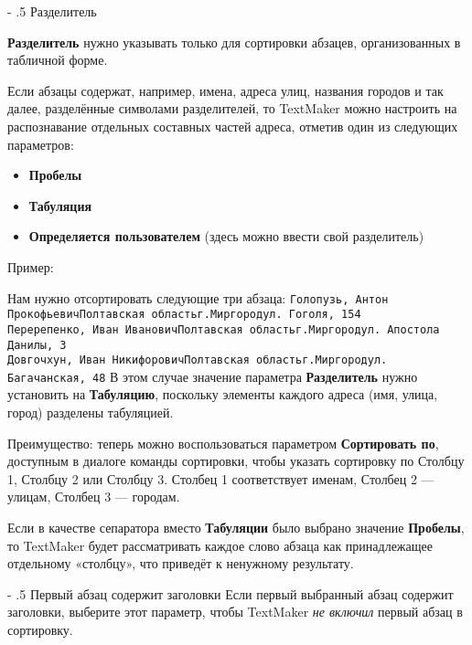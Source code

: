﻿\documentclass[a4paper,10pt]{article}
\makeatletter
\renewcommand\paragraph{%
   \@startsection{paragraph}{4}{0mm}%
      {-\baselineskip}%
      {.5\baselineskip}%
      {\normalfont\normalsize\bfseries}}
\makeatother
\begin{document}
\paragraph{Разделитель}

\textbf{Разделитель} нужно указывать только для сортировки абзацев, организованных в табличной форме.

Если абзацы содержат, например, имена, адреса улиц, названия городов и так далее, разделённые символами разделителей, то TextMaker можно настроить на распознавание отдельных составных частей адреса, отметив один из следующих параметров:
\begin{itemize}
 \item \textbf{Пробелы}
 \item \textbf{Табуляция}
 \item \textbf{Определяется пользователем} (здесь можно ввести свой разделитель)
\end{itemize}

Пример:

Нам нужно отсортировать следующие три абзаца:
\newline
\newline
\texttt{Голопузь, Антон ПрокофьевичПолтавская областьг.Миргородул. Гоголя, 154}\\
\texttt{Перерепенко, Иван ИвановичПолтавская областьг.Миргородул. Апостола Данилы, 3}\\
\texttt{Довгочхун, Иван НикифоровичПолтавская областьг.Миргородул. Багачанская, 48} 
\newline
\newline
В этом случае значение параметра \textbf{Разделитель} нужно установить на \textbf{Табуляцию}, поскольку элементы каждого адреса (имя, улица, город) разделены табуляцией.

Преимущество: теперь можно воспользоваться параметром \textbf{Сортировать по}, доступным в диалоге команды сортировки, чтобы указать сортировку по Столбцу 1, Столбцу 2 или Столбцу 3. Столбец 1 соответствует именам, Столбец 2 — улицам, Столбец 3 — городам.

Если в качестве сепаратора вместо \textbf{Табуляции} было выбрано значение \textbf{Пробелы}, то TextMaker будет рассматривать каждое слово абзаца как принадлежащее отдельному «столбцу», что приведёт к ненужному результату.

\paragraph{Первый абзац содержит заголовки}
Если первый выбранный абзац содержит заголовки, выберите этот параметр, чтобы TextMaker \textit{не включил} первый абзац в сортировку.
\end{document}
